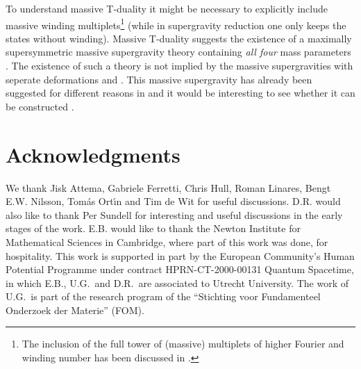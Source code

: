 \documentclass[12pt,a4paper]{article}
\begin{document}
To understand massive T-duality it might be necessary to explicitly
include massive winding multiplets\footnote{The inclusion of the full
tower of (massive) multiplets of higher Fourier and winding number has
been discussed in
\cite{Abou-Zeid:1999fv,deWit:2000wu,deWit:2000zz}.}
(while in supergravity reduction
one only keeps the states without winding).
Massive T-duality suggests the existence of a maximally
supersymmetric
massive supergravity theory containing {\it all four} mass parameters
\coordHE{}. The existence of such a theory is not implied by the
massive supergravities with seperate deformations \coordHE{} and \coordHE{}.
This massive supergravity has already been
suggested for
different reasons in \cite{Meessen:1998qm} and it would be interesting to
see whether it can be constructed \cite{Bergshoeff:2002}.


\section*{Acknowledgments}

We thank Jisk Attema, Gabriele Ferretti, Chris Hull, Roman Linares, Bengt E.W. Nilsson, 
Tom\'as Ort\'\i n
and Tim de Wit for useful discussions. D.R. would also like to
thank Per Sundell for interesting and useful discussions in the
early stages of the work. E.B. would like to thank the Newton Institute
for Mathematical Sciences in Cambridge, where part of this
work was done, for hospitality. This work is supported in part by the
European Community's Human Potential Programme under contract
HPRN-CT-2000-00131 Quantum Spacetime, in which E.B., U.G.~and
D.R.~are associated to Utrecht University. The work of U.G.~is
part of the research program of the ``Stichting voor Fundamenteel
Onderzoek der Materie'' (FOM).


\appendix
\end{document}
